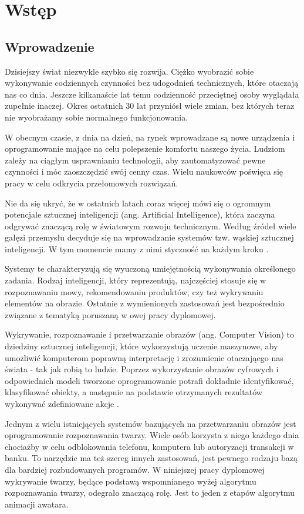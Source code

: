 \chapter{Wstęp}
\label{cha:wstep}

\section{Wprowadzenie}
Dzisiejszy świat niezwykle szybko się rozwija. Ciężko wyobrazić sobie wykonywanie codziennych czynności bez udogodnień technicznych, które otaczają nas co dnia. Jeszcze kilkanaście lat temu codzienność przeciętnej 
osoby wyglądała zupełnie inaczej. Okres ostatnich 30 lat przyniósł wiele zmian, bez których teraz nie wyobrażamy sobie normalnego funkcjonowania.

W obecnym czasie, z dnia na dzień, na rynek wprowadzane są nowe urządzenia i oprogramowanie mające na celu polepszenie komfortu naszego życia. Ludziom zależy na ciągłym usprawnianiu technologii, aby zautomatyzować pewne czynności i móc zaoszczędzić swój cenny czas. Wielu naukowców poświęca się pracy w celu odkrycia przełomowych rozwiązań.

Nie da się ukryć, że w ostatnich latach coraz więcej mówi się o ogromnym potencjale sztucznej inteligencji (ang. Artificial Intelligence), która zaczyna odgrywać znaczącą rolę w światowym rozwoju technicznym. Według źródeł wiele gałęzi przemysłu decyduje się na wprowadzanie systemów tzw. wąskiej sztucznej inteligencji. W tym momencie mamy z nimi styczność na każdym kroku \cite{ai}.   

Systemy te charakteryzują się wyuczoną umiejętnością wykonywania określonego zadania. Rodzaj inteligencji, który reprezentują, najczęściej stosuje się w rozpoznawaniu mowy, rekomendowaniu produktów, czy też wykrywaniu elementów na obrazie. Ostatnie z wymienionych zastosowań jest bezpośrednio związane z tematyką poruszaną w owej pracy dyplomowej.

Wykrywanie, rozpoznawanie i przetwarzanie obrazów (ang. Computer Vision) to dziedziny sztucznej inteligencji, które wykorzystują uczenie maszynowe, aby umożliwić komputerom poprawną interpretację i zrozumienie otaczająego nas świata - tak jak robią to ludzie. Poprzez wykorzystanie obrazów cyfrowych i odpowiednich modeli tworzone oprogramowanie potrafi dokładnie identyfikować, klasyfikować obiekty, a następnie na podstawie otrzymanych rezultatów wykonywać zdefiniowane akcje \cite{computervision}.

Jednym z wielu istniejących systemów bazujących na przetwarzaniu obrazów jest oprogramowanie rozpoznawania twarzy. Wiele osób korzysta z niego każdego dnia chociażby w celu odblokowania telefonu, komputera lub autoryzacji transakcji w banku. To narzędzie ma też szereg innych zastosowań, jest pewnego rodzaju bazą dla bardziej rozbudowanych programów. W niniejszej pracy dyplomowej wykrywanie twarzy, będące podstawą wspomnianego wyżej algorytmu rozpoznawania twarzy, odegrało znaczącą rolę. Jest to jeden z etapów algorytmu animacji awatara.

